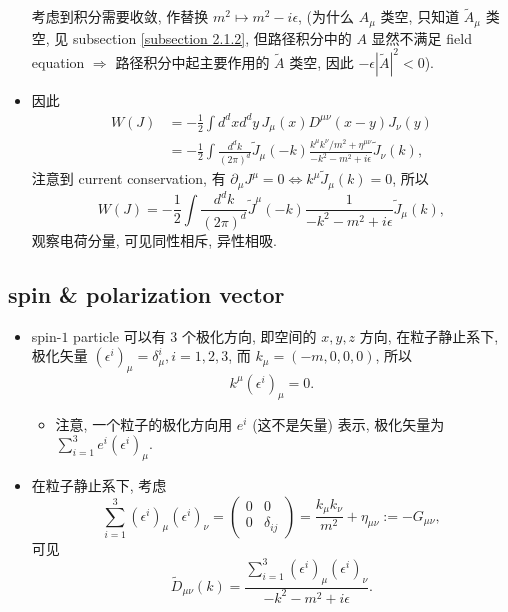 \begin{itemize}
	考虑到积分需要收敛, 作替换 $m^2 \mapsto m^2 - i \epsilon$, (为什么 $A_\mu$ 类空, 只知道 $\tilde{A}_\mu$ 类空, 见 subsection \ref{subsection 2.1.2}, 但路径积分中的 $A$ 显然不满足 field equation $\Longrightarrow$ 路径积分中起主要作用的 $\tilde{A}$ 类空, 因此 $- \epsilon |\tilde{A}|^2 < 0$).
	
	\item 因此
	\begin{align}
		W(J) &= - \frac{1}{2} \int d^d x d^d y \, J_\mu(x) D^{\mu \nu}(x - y) J_\nu(y) \\
		&= - \frac{1}{2} \int \frac{d^d k}{(2 \pi)^d} \tilde{J}_\mu(- k) \frac{k^\mu k^\nu / m^2 + \eta^{\mu \nu}}{- k^2 - m^2 + i \epsilon} \tilde{J}_\nu(k),
	\end{align}
	注意到 current conservation, 有 $\partial_\mu J^\mu = 0 \iff k^\mu \tilde{J}_\mu(k) = 0$, 所以
	\begin{equation}
		W(J) = - \frac{1}{2} \int \frac{d^d k}{(2 \pi)^d} \tilde{J}^\mu(- k) \frac{1}{- k^2 - m^2 + i \epsilon} \tilde{J}_\mu(k),
	\end{equation}
	观察电荷分量, 可见同性相斥, 异性相吸.
\end{itemize}

\subsection{spin \& polarization vector} \label{subsection 2.1.1}
\begin{itemize}
	\item spin-$1$ particle 可以有 3 个极化方向, 即空间的 $x, y, z$ 方向, 在粒子静止系下, 极化矢量 $(\epsilon^i)_\mu = \delta^i_\mu, i = 1, 2, 3$, 而 $k_\mu = (- m, 0, 0, 0)$, 所以
	\begin{equation}
		k^\mu (\epsilon^i)_\mu = 0.
	\end{equation}
	\begin{itemize}
		\item 注意, 一个粒子的极化方向用 $e^i$ (这不是矢量) 表示, 极化矢量为 $\sum_{i = 1}^3 e^i (\epsilon^i)_\mu$.
	\end{itemize}
	
	\item 在粒子静止系下, 考虑
	\begin{equation}
		\sum_{i = 1}^3 (\epsilon^i)_\mu (\epsilon^i)_\nu = \begin{pmatrix}
			0 & 0 \\
			0 & \delta_{i j}
		\end{pmatrix} = \frac{k_\mu k_\nu}{m^2} + \eta_{\mu \nu} := - G_{\mu \nu},
	\end{equation}
	可见
	\begin{equation}
		\tilde{D}_{\mu \nu}(k) = \frac{\sum_{i = 1}^3 (\epsilon^i)_\mu (\epsilon^i)_\nu}{- k^2 - m^2 + i \epsilon}.
	\end{equation}
\end{itemize}

